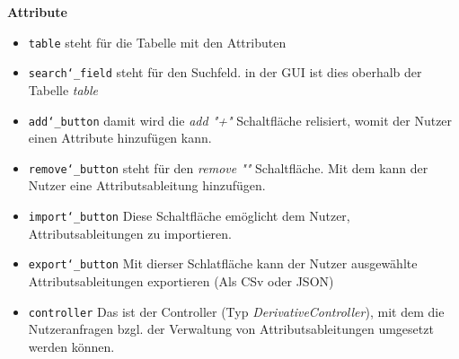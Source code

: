 \documentclass{article}
\begin{document}
\textbf{{Attribute}}
\begin{itemize}
\item \texttt{table} \newline steht für die Tabelle mit den Attributen
\item \texttt{search\char`_field} \newline steht für den Suchfeld. in der GUI ist dies oberhalb der Tabelle \textit{table}
\item \texttt{add\char`_button} \newline damit wird die \textit{add "+"} Schaltfläche relisiert, womit der Nutzer einen Attribute hinzufügen kann.
\item \texttt{remove\char`_button} \newline steht für den \textit{remove "\textendash"} Schaltfläche. Mit dem kann der Nutzer eine Attributsableitung hinzufügen. 
\item \texttt{import\char`_button} \newline Diese Schaltfläche emöglicht dem Nutzer, Attributsableitungen zu importieren.
\item \texttt{export\char`_button} \newline Mit dierser Schlatfläche kann der Nutzer ausgewählte Attributsableitungen exportieren (Als CSv oder JSON)
\item \texttt{controller} \newline Das ist der Controller (Typ \textit{DerivativeController}), mit dem die Nutzeranfragen bzgl. der Verwaltung von Attributsableitungen umgesetzt werden können.
\end{itemize}
\end{document}

